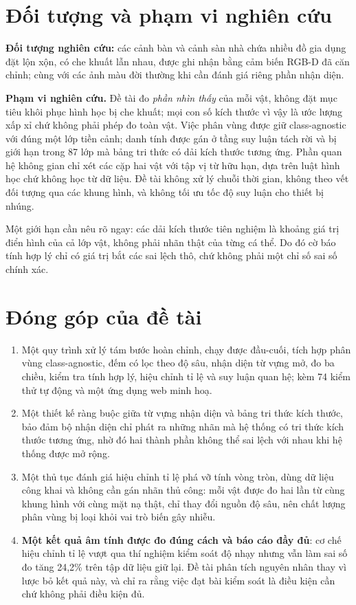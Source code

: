\section{Đối tượng và phạm vi nghiên cứu}

\textbf{Đối tượng nghiên cứu:} các cảnh bàn và cảnh sàn nhà chứa nhiều đồ gia dụng đặt lộn xộn,
có che khuất lẫn nhau, được ghi nhận bằng cảm biến RGB-D đã căn chỉnh; cùng với các ảnh màu đời
thường khi cần đánh giá riêng phần nhận diện.

\textbf{Phạm vi nghiên cứu.} Đề tài đo \emph{phần nhìn thấy} của mỗi vật, không đặt mục tiêu
khôi phục hình học bị che khuất; mọi con số kích thước vì vậy là ước lượng xấp xỉ chứ không phải
phép đo toàn vật. Việc phân vùng được giữ class-agnostic với đúng một lớp tiền cảnh; danh tính
được gán ở tầng suy luận tách rời và bị giới hạn trong 87 lớp mà bảng tri thức có dải
kích thước tương ứng. Phần quan hệ không gian chỉ xét các cặp hai vật với tập vị từ hữu hạn, dựa
trên luật hình học chứ không học từ dữ liệu. Đề tài không xử lý chuỗi thời gian, không theo vết
đối tượng qua các khung hình, và không tối ưu tốc độ suy luận cho thiết bị nhúng.

Một giới hạn cần nêu rõ ngay: các dải kích thước tiên nghiệm là khoảng giá trị điển hình của cả
lớp vật, không phải nhãn thật của từng cá thể. Do đó cờ báo tính hợp lý chỉ có giá trị bắt các
sai lệch thô, chứ không phải một chỉ số sai số chính xác.

\section{Đóng góp của đề tài}

\begin{enumerate}[leftmargin=1.5cm]
\item Một quy trình xử lý tám bước hoàn chỉnh, chạy được đầu-cuối, tích hợp phân vùng
class-agnostic, đếm có lọc theo độ sâu, nhận diện từ vựng mở, đo ba chiều, kiểm tra tính hợp lý,
hiệu chỉnh tỉ lệ và suy luận quan hệ; kèm 74 kiểm thử tự động và một ứng dụng web minh hoạ.

\item Một thiết kế ràng buộc giữa từ vựng nhận diện và bảng tri thức kích thước, bảo đảm bộ nhận diện chỉ phát ra những nhãn mà hệ thống có tri thức kích thước tương ứng, nhờ đó hai thành phần không thể sai lệch với nhau khi hệ thống được mở rộng.

\item Một thủ tục đánh giá hiệu chỉnh tỉ lệ phá vỡ tính vòng tròn, dùng dữ liệu công khai và
không cần gán nhãn thủ công: mỗi vật được đo hai lần từ cùng khung hình với cùng mặt nạ thật,
chỉ thay đổi nguồn độ sâu, nên chất lượng phân vùng bị loại khỏi vai trò biến gây nhiễu.

\item \textbf{Một kết quả âm tính được đo đúng cách và báo cáo đầy đủ}: cơ chế hiệu chỉnh tỉ lệ
vượt qua thí nghiệm kiểm soát độ nhạy nhưng vẫn làm sai số đo tăng 24,2\% trên tập dữ liệu giữ
lại. Đề tài phân tích nguyên nhân thay vì lược bỏ kết quả này, và chỉ ra rằng việc đạt bài kiểm
soát là điều kiện cần chứ không phải điều kiện đủ.
\end{enumerate}

